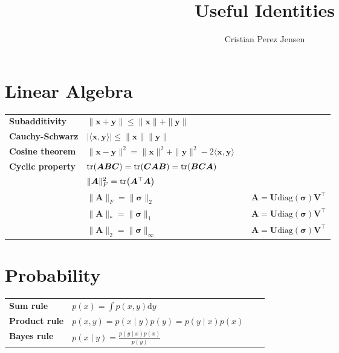 \documentclass{article}
\title{\textsf{\textbf{Useful Identities}}}
\author{\textsf{Cristian Perez Jensen}}
\date{}
\newcommand{\lft}{\mathopen{}\mathclose\bgroup\left}
\newcommand{\rgt}{\aftergroup\egroup\right}
\renewcommand{\vec}[1]{\bm{#1}}
\newcommand{\mat}[1]{\bm{#1}}
\newcommand{\transpose}[1]{#1^\top}
\newcommand{\trace}[1]{\mathrm{tr}\lft(#1\rgt)}
\begin{document}
\maketitle

\section*{Linear Algebra}

\begin{xltabular}{\textwidth}{@{}llXr@{}}
    \toprule
    \textbf{Subadditivity}   & $\| \vec{x} + \vec{y} \| \leq \| \vec{x} \| + \| \vec{y} \|$ \\
    \textbf{Cauchy-Schwarz}  & $|\langle \vec{x}, \vec{y} \rangle| \leq \| \vec{x} \| \| \vec{y} \|$ \\
    \textbf{Cosine theorem}  & $\| \vec{x} - \vec{y} \|^2 = \| \vec{x} \|^2 + \| \vec{y} \|^2 - 2 \langle \vec{x}, \vec{y} \rangle$ \\
    \textbf{Cyclic property} & $\trace{\mat{A} \mat{B} \mat{C}} = \trace{\mat{C} \mat{A} \mat{B}} = \trace{\mat{B} \mat{C} \mat{A}}$ \\
    & $\| \mat{A} \|_F^2 = \trace{\transpose{\mat{A}} \mat{A}}$ \\
    & $\| \mat{A} \|_F = \| \vec{\sigma} \|_2$ & & $\mat{A} = \mat{U} \mathrm{diag}(\vec{\sigma}) \transpose{\mat{V}}$ \\
    & $\| \mat{A} \|_* = \| \vec{\sigma} \|_1$ & & $\mat{A} = \mat{U} \mathrm{diag}(\vec{\sigma}) \transpose{\mat{V}}$ \\
    & $\| \mat{A} \|_2 = \| \vec{\sigma} \|_\infty$ & & $\mat{A} = \mat{U} \mathrm{diag}(\vec{\sigma}) \transpose{\mat{V}}$ \\
    \bottomrule
\end{xltabular}

\section*{Probability}

\begin{xltabular}{\textwidth}{@{}llXr@{}}
    \toprule
    \textbf{Sum rule}     & $p(x) = \int p(x, y) \mathrm{d}y$               & & \\
    \textbf{Product rule} & $p(x, y) = p(x \mid y) p(y) = p(y \mid x) p(x)$ & & \\
    \textbf{Bayes rule}   & $p(x \mid y) = \frac{p(y \mid x) p(x)}{p(y)}$   & & \\
    \bottomrule
\end{xltabular}
\end{document}
